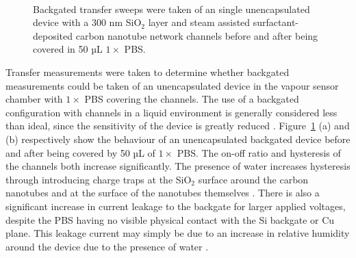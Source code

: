 \documentclass[
  a4paper,
]{scrbook}
\begin{document}
\begin{figure}
\begin{minipage}[t]{0.01\linewidth}
{\centering 

~

}

\end{minipage}%

\caption{\label{fig-buffer-effect-on-backgate}Backgated transfer sweeps
were taken of an single unencapsulated device with a 300 nm SiO\(_2\)
layer and steam assisted surfactant-deposited carbon nanotube network
channels before and after being covered in 50 µL \(1 \times\) PBS.}

\end{figure}

Transfer measurements were taken to determine whether backgated
measurements could be taken of an unencapsulated device in the vapour
sensor chamber with \(1 \times\) PBS covering the channels. The use of a
backgated configuration with channels in a liquid environment is
generally considered less than ideal, since the sensitivity of the
device is greatly reduced \autocite{Li2023}.
Figure~\ref{fig-buffer-effect-on-backgate} (a) and (b) respectively show
the behaviour of an unencapsulated backgated device before and after
being covered by 50 µL of \(1 \times\) PBS. The on-off ratio and
hysteresis of the channels both increase significantly. The presence of
water increases hysteresis through introducing charge traps at the
SiO\(_2\) surface around the carbon nanotubes and at the surface of the
nanotubes themselves \autocite{Kim2003,Lee2007,Franklin2012,Ha2014}.
There is also a significant increase in current leakage to the backgate
for larger applied voltages, despite the PBS having no visible physical
contact with the Si backgate or Cu plane. This leakage current may
simply be due to an increase in relative humidity around the device due
to the presence of water \autocite{Conseil2014}.
\end{document}
